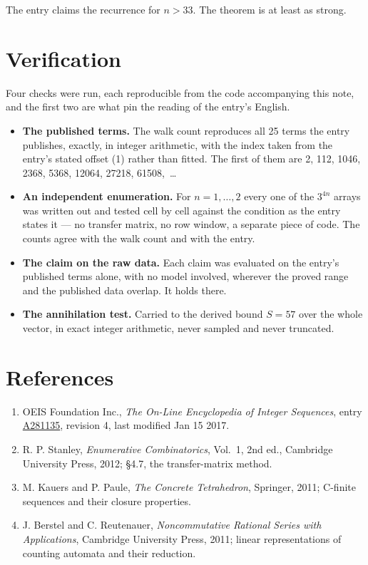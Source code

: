 \documentclass[11pt]{article}
\theoremstyle{definition}
\begin{document}
The entry claims the recurrence for $n > 33$. The theorem is at least as strong.

\section{Verification}

Four checks were run, each reproducible from the code accompanying this note, and the first two are what pin the reading of the entry's English.

\begin{itemize}

\item {\bfseries The published terms.} The walk count reproduces all 25 terms the entry publishes, exactly, in integer arithmetic, with the index taken from the entry's stated offset (1) rather than fitted. The first of them are 2, 112, 1046, 2368, 5368, 12064, 27218, 61508,~\dots

\item {\bfseries An independent enumeration.} For $n = 1,\dots,2$ every one of the $3^{4n}$ arrays was written out and tested cell by cell against the condition as the entry states it --- no transfer matrix, no row window, a separate piece of code. The counts agree with the walk count and with the entry.

\item {\bfseries The claim on the raw data.} Each claim was evaluated on the entry's published terms alone, with no model involved, wherever the proved range and the published data overlap. It holds there.

\item {\bfseries The annihilation test.} Carried to the derived bound $S = 57$ over the whole vector, in exact integer arithmetic, never sampled and never truncated.

\end{itemize}

\section{References}

\begin{enumerate}

\item OEIS Foundation Inc., \emph{The On-Line Encyclopedia of Integer Sequences}, entry \href{https://oeis.org/A281135}{A281135}, revision 4, last modified Jan 15 2017.

\item R. P. Stanley, \emph{Enumerative Combinatorics}, Vol.~1, 2nd ed., Cambridge University Press, 2012; \S4.7, the transfer-matrix method.

\item M. Kauers and P. Paule, \emph{The Concrete Tetrahedron}, Springer, 2011; C-finite sequences and their closure properties.

\item J. Berstel and C. Reutenauer, \emph{Noncommutative Rational Series with Applications}, Cambridge University Press, 2011; linear representations of counting automata and their reduction.

\end{enumerate}
\end{document}
